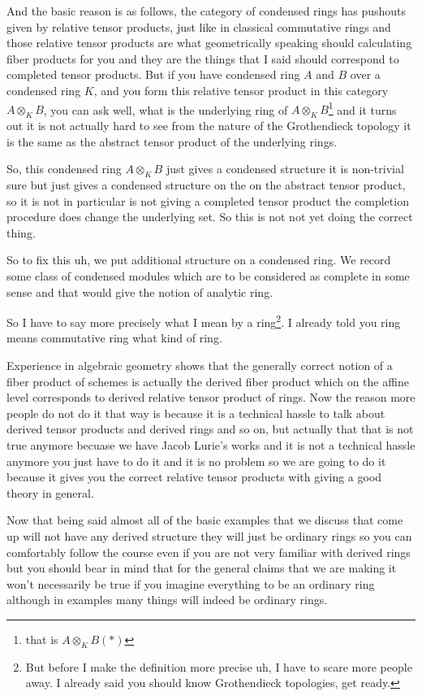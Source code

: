 And the basic reason is as follows, the category of condensed rings has pushouts given by relative tensor products, just like in classical 
commutative rings and those relative tensor products are what geometrically speaking should calculating fiber products for you and 
they are the things that I said should correspond to completed tensor products. But if you have condensed ring $A$ and $B$ over a condensed ring $K$,
 and you form this relative tensor product in this category $A\otimes_{K} B$, you can ask well, what is the underlying 
 ring of $A\otimes_{K} B$\footnote{that is $A\otimes_{K} B (*)$} and it turns out it is not actually hard to see from the nature of the Grothendieck topology it is the 
 same as the abstract tensor product of the underlying rings.

So, this condensed ring $A\otimes_{K} B$ just gives a condensed structure it is non-trivial sure but 
just gives a condensed structure on the on the abstract tensor product, so it is not in particular is not giving 
a completed tensor product the completion procedure does change the underlying set. So this is not not yet doing the 
correct thing.

So to fix this uh, we put additional structure on a condensed ring. We record some class of condensed modules which are to be considered 
as complete in some sense and that would give the notion of analytic ring.


So I have to say more precisely what I mean by a ring\footnote{
    But before I make the definition more precise uh, I have to scare more people away. I already said you should 
    know Grothendieck topologies, get ready.}. I already told you ring means commutative ring what kind of ring. 

Experience in algebraic geometry shows that the generally correct notion of a fiber product of schemes is 
actually the derived fiber product which on the affine level corresponds to derived relative tensor product of rings. Now the 
reason more people do not do it that way is because it is a technical hassle to talk about derived tensor products and derived rings 
and so on, but actually that that is not true anymore becuase we have Jacob Lurie's works  and it is not a technical hassle anymore 
you just have to do it and it is no problem so we are going to do it because it gives you the correct relative tensor products 
with giving a good theory in general.


Now that being said almost all of the basic examples that we discuss that come up will not have any derived structure 
they will just be ordinary rings so you can comfortably follow the course even if you are not very 
familiar with derived rings but you should bear in mind that for the general claims that we are making it 
won't necessarily be true if you imagine everything to be an ordinary ring although in examples many things will indeed be ordinary 
rings.

